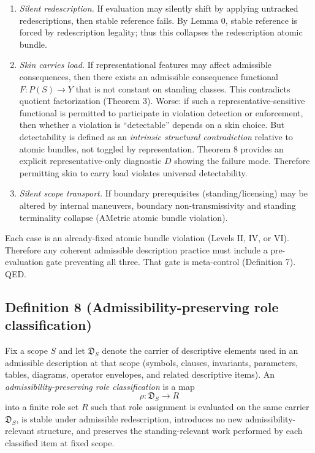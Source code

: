 \documentclass[12pt]{article}
\theoremstyle{plain}
\begin{document}
\begin{enumerate}[leftmargin=*]
\item \emph{Silent redescription.} If evaluation may silently shift by applying untracked redescriptions, then stable reference fails. By Lemma 0, stable reference is forced by redescription legality; thus this collapses the redescription atomic bundle.

\item \emph{Skin carries load.} If representational features may affect admissible consequences, then there exists an admissible consequence functional $F:P(S)\to Y$ that is not constant on standing classes. This contradicts quotient factorization (Theorem 3). Worse: if such a representative-sensitive functional is permitted to participate in violation detection or enforcement, then whether a violation is ``detectable'' depends on a skin choice. But detectability is defined as an \emph{intrinsic structural contradiction} relative to atomic bundles, not toggled by representation. Theorem 8 provides an explicit representative-only diagnostic $D$ showing the failure mode. Therefore permitting skin to carry load violates universal detectability.

\item \emph{Silent scope transport.} If boundary prerequisites (standing/licensing) may be altered by internal maneuvers, boundary non-transmissivity and standing terminality collapse (AMetric atomic bundle violation).
\end{enumerate}

Each case is an already-fixed atomic bundle violation (Levels II, IV, or VI). Therefore any coherent admissible description practice must include a pre-evaluation gate preventing all three. That gate is meta-control (Definition 7). QED.

\subsection{Definition 8 (Admissibility-preserving role classification)}

Fix a scope $S$ and let $\mathfrak{D}_S$ denote the carrier of descriptive elements used in an admissible description at that scope (symbols, clauses, invariants, parameters, tables, diagrams, operator envelopes, and related descriptive items). An \emph{admissibility-preserving role classification} is a map
\[
\rho: \mathfrak{D}_S \to R
\]
into a finite role set $R$ such that role assignment is evaluated on the same carrier $\mathfrak{D}_S$, is stable under admissible redescription, introduces no new admissibility-relevant structure, and preserves the standing-relevant work performed by each classified item at fixed scope.
\end{document}
